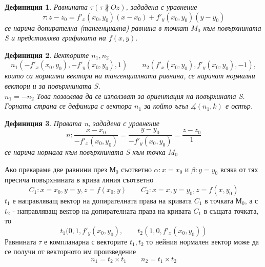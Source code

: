 \documentclass[a4paper,fleqn,12pt]{article}
\newtheorem{definition}{Дефиниция}[subsection]
\theoremstyle{definition}
\begin{document}
\begin{definition}
Равнината $\tau (\tau \nparallel Oz)$, зададена с уравнение 
$$\tau : z - z_0 = f'_x (x_0, y_0)(x - x_0) + f'_y (x_0, y_0)(y - y_0) $$
се нарича допирателна (тангенциална) равнина в точкат $M_0$ към повърхнината S и представлява графиката на $f(x,y)$. 
\end{definition}

\begin{definition}
Векторите $n_1, n_2$
$$n_1 (-f'_x (x_0, y_0), -f'_y (x_0, y_0), 1) \qquad n_2 (f'_x (x_0, y_0), f'_y (x_0, y_0), -1) ,$$ 
които са нормални вектори на тангенциалната равнина, се наричат нормални вектори и за повърхнината S. \\
$n_1 = -n_2$ Това позволява да се използват за ориентация на повърхината S. \\
Горната страна се дефинира с вектора $n_1$ за който ъгъл $\measuredangle (n_1,k)$ е остър. 
\end{definition}

\begin{definition}
Правата n, зададена с уравнение 
$$n: \dfrac{x - x_0}{-f'_x (x_0, y_0)} = \dfrac{y-y_0}{-f'_y (x_0, y_0)} = \dfrac{z - z_0}{1} $$ 
се нарича нормала към повърхнината S към точка $M_0$
\end{definition}

Ако прекараме две равнини през $М_0$ съответно $\alpha: x = x_0$ и $\beta: y = y_0$ всяка от тях пресича повърхнината в крива линия съответно
$$C_1: x = x_0, y = y, z = f(x_0, y) \qquad C_2: x = x, y = y_0, z = f(x, y_0)$$
$t_1$ е  направляващ вектор на допирателната права на кривата $C_1$ в точката $М_0$, а с $t_2$ - направляващ вектор на допирателната права на кривата $C_1$ в същата точката, то
$$t_1 (0, 1, f'_y(x_0,y_0), \qquad t_2 (1, 0, f'_x (x_0,y_0))$$
Равнината $\tau$ е компланарна с векторите $t_1, t_2$ то нейния нормален вектор може да се получи от векторното им произведение
$$n_1 = t_2 \times t_1 \qquad n_2 = t_1 \times t_2$$
\end{document}
